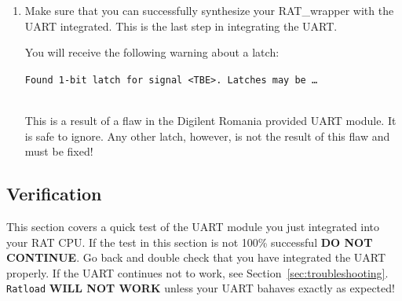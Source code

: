 \documentclass[notitlepage]{article}
\newcommand{\warningsign}{\fontencoding{U}\fontfamily{futs}\Large\selectfont\char 66\relax}
\begin{document}
\begin {enumerate}
\begin{verbatim}
outputs: process(CLK) begin
   if (rising_edge(CLK)) then
      s_d_strb <= '0';
      s_d_conf <= '0';
      if (S_IO_OE = '1') then
         if (s_port_id = LEDS_ID) then
            LEDS <= s_output_port;
         elsif (s_port_id = UART_OUT_ID) then
            s_db_from_rat <= s_output_port;
            s_d_strb <= '1';
            s_d_conf <= '1';
         end if;
      end if;
   end if;
end process outputs;
\end{verbatim}

\item Make sure that you can successfully synthesize your RAT\_wrapper with the UART integrated. This is the last step in integrating the UART.
\begin{infobox}
  \textbf{{\warningsign}} You will receive the following warning about a latch:\\
    \centerline{\texttt{Found 1-bit latch for signal \textless TBE\textgreater. Latches may be \ldots}}\\
    This is a result of a flaw in the Digilent Romania provided UART module. It is safe to ignore. Any other latch, however, is not the result of this flaw and must be fixed!
\end{infobox}
\end{enumerate}

\subsection{Verification}
This section covers a quick test of the UART module you just integrated into your RAT CPU. If the test in this section is not 100\% successful \textbf{DO NOT CONTINUE}. Go back and double check that you have integrated the UART properly. If the UART continues not to work, see Section~\ref{sec:troubleshooting}. \texttt{Ratload} \textbf{WILL NOT WORK} unless your UART bahaves exactly as expected!
\end{document}
